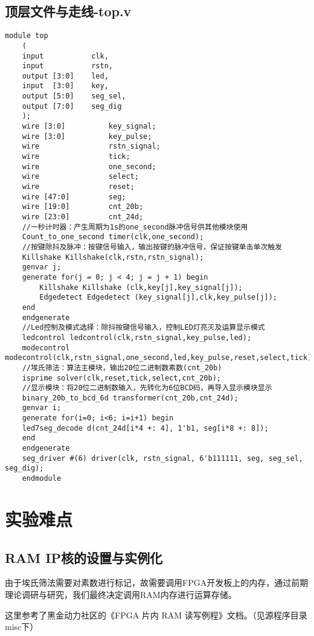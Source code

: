	\subsection{顶层文件与走线-top.v}
	\begin{lstlisting}[style=verilog]
	module top
	(
	input           clk,
	input           rstn,
	output [3:0]    led,
	input  [3:0]    key,
	output [5:0]    seg_sel,
	output [7:0]    seg_dig
	);
	wire [3:0]          key_signal;
	wire [3:0]          key_pulse;
	wire                rstn_signal;
	wire                tick;
	wire                one_second;
	wire                select;
	wire                reset;
	wire [47:0]         seg;
	wire [19:0]         cnt_20b;
	wire [23:0]         cnt_24d;
	//一秒计时器：产生周期为1s的one_second脉冲信号供其他模块使用
	Count_to_one_second timer(clk,one_second);
	//按键除抖及脉冲：按键信号输入，输出按键的脉冲信号，保证按键单击单次触发
	Killshake Killshake(clk,rstn,rstn_signal);
	genvar j;
	generate for(j = 0; j < 4; j = j + 1) begin
		Killshake Killshake (clk,key[j],key_signal[j]);
		Edgedetect Edgedetect (key_signal[j],clk,key_pulse[j]);
	end
	endgenerate
	//Led控制及模式选择：除抖按键信号输入，控制LED灯亮灭及运算显示模式
	ledcontrol ledcontrol(clk,rstn_signal,key_pulse,led);
	modecontrol modecontrol(clk,rstn_signal,one_second,led,key_pulse,reset,select,tick);
	//埃氏筛法：算法主模块，输出20位二进制数素数(cnt_20b)
	isprime solver(clk,reset,tick,select,cnt_20b);
	//显示模块：将20位二进制数输入，先转化为6位BCD码，再导入显示模块显示
	binary_20b_to_bcd_6d transformer(cnt_20b,cnt_24d);
	genvar i;
	generate for(i=0; i<6; i=i+1) begin
	led7seg_decode d(cnt_24d[i*4 +: 4], 1'b1, seg[i*8 +: 8]);
	end
	endgenerate
	seg_driver #(6) driver(clk, rstn_signal, 6'b111111, seg, seg_sel, seg_dig);
	endmodule
	\end{lstlisting}
	\section{实验难点}
	\subsection{RAM IP核的设置与实例化}
	由于埃氏筛法需要对素数进行标记，故需要调用FPGA开发板上的内存，通过前期理论调研与研究，我们最终决定调用RAM内存进行运算存储。
	
	这里参考了黑金动力社区的《FPGA 片内 RAM 读写例程》文档。（见源程序目录misc下）

